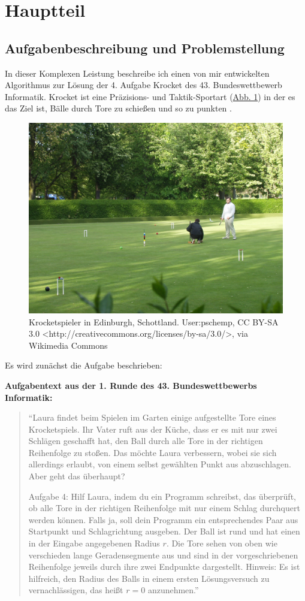 \section{Hauptteil}
\subsection{Aufgabenbeschreibung und Problemstellung}

In dieser Komplexen Leistung beschreibe ich einen von mir entwickelten Algorithmus zur Lösung der 4. Aufgabe \glqq Krocket\grqq{} des 43. Bundeswettbewerb Informatik. Krocket ist eine Präzisions- und Taktik-Sportart (\hyperref[fig:spieler]{Abb. 1}) in der es das Ziel ist, Bälle durch Tore zu schießen und so zu punkten \cite{krocket_regeln}.


\begin{figure}[h]
\label{fig:spieler}
    \centering
    \includegraphics[width=0.8\linewidth]{images/krocketspieler.jpg}
    \caption{Krocketspieler in Edinburgh, Schottland. User:pschemp, CC BY-SA 3.0 <http://creativecommons.org/licenses/by-sa/3.0/>, via Wikimedia Commons}

\end{figure}

Es wird zunächst die Aufgabe beschrieben:

\textbf{Aufgabentext aus der 1. Runde des 43. Bundeswettbewerbs Informatik:}
\begin{quote}
	``Laura findet beim Spielen im Garten einige aufgestellte Tore eines Krocketspiels. Ihr Vater ruft aus der Küche, dass er es mit nur zwei Schlägen geschafft hat, den Ball durch alle Tore in der richtigen Reihenfolge zu stoßen. Das möchte Laura verbessern, wobei sie sich allerdings erlaubt, von einem selbst gewählten Punkt aus abzuschlagen. Aber geht das überhaupt?
	
	Aufgabe 4: Hilf Laura, indem du ein Programm schreibst, das überprüft, ob alle Tore in der richtigen Reihenfolge mit nur einem Schlag durchquert werden können. Falls ja, soll dein Programm ein entsprechendes Paar aus Startpunkt und Schlagrichtung ausgeben. Der Ball ist rund und hat einen in der Eingabe angegebenen Radius $r$. Die Tore sehen von oben wie verschieden lange Geradensegmente aus und sind in der vorgeschriebenen Reihenfolge jeweils durch ihre zwei Endpunkte dargestellt. Hinweis: Es ist hilfreich, den Radius des Balls in einem ersten Lösungsversuch zu vernachlässigen, das heißt $r=0$ anzunehmen.'' \cite{aufgaben}
\end{quote}

